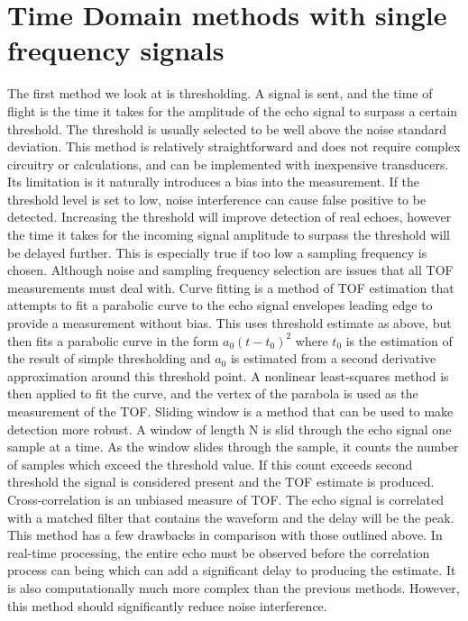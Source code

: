 \documentclass[]{final_report}
\begin{document}
\section{Time Domain methods with single frequency signals}
The first method we look at is thresholding. A signal is sent, and the time of flight is the time it takes for the amplitude of the echo signal to surpass a certain threshold. The threshold is usually selected to be well above the noise standard deviation. This method is relatively straightforward and does not require complex circuitry or calculations, and can be implemented with inexpensive transducers. Its limitation is it naturally introduces a bias into the measurement. If the threshold level is set to low, noise interference can cause false positive to be detected. Increasing the threshold will improve detection of real echoes, however the time it takes for the incoming signal amplitude to surpass the threshold will be delayed further. This is especially true if too low a sampling frequency is chosen. Although noise and sampling frequency selection are issues that all TOF measurements must deal with. 
Curve fitting is a method of TOF estimation that attempts to fit a parabolic curve to the echo signal envelopes leading edge to provide a measurement without bias. This uses threshold estimate as above, but then fits a parabolic curve in the form $a_0 (t-t_0 )^{2} $ where $t_0$ is the estimation of the result of simple thresholding and $a_0$ is estimated from a second derivative approximation around this threshold point. A nonlinear least-squares method is then applied to fit the curve, and the vertex of the parabola is used as the measurement of the TOF. 
Sliding window is a method that can be used to make detection more robust. A window of length N is slid through the echo signal one sample at a time. As the window slides through the sample, it counts the number of samples which exceed the threshold value. If this count exceeds second threshold the signal is considered present and the TOF estimate is produced. 
Cross-correlation is an unbiased measure of TOF. The echo signal is correlated with a matched filter that contains the waveform and the delay will be the peak. This method has a few drawbacks in comparison with those outlined above. In real-time processing, the entire echo must be observed before the correlation process can being which can add a significant delay to producing the estimate. It is also computationally much more complex than the previous methods. However, this method should significantly reduce noise interference. 
\end{document}
